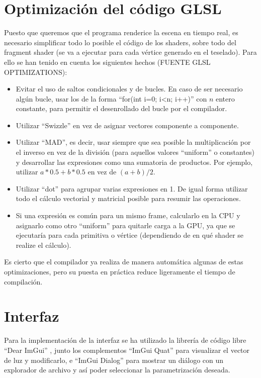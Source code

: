 \newpage
\section*{Optimización del código GLSL}
	Puesto que queremos que el programa renderice la escena en tiempo real, es necesario simplificar todo lo posible el código de los shaders, sobre todo del fragment shader (se va a ejecutar para cada vértice generado en el teselado). Para ello se han tenido en cuenta los siguientes hechos (FUENTE GLSL OPTIMIZATIONS):
	\begin{itemize}
		\item Evitar el uso de saltos condicionales y de bucles. En caso de ser necesario algún bucle, usar los de la forma ``for(int i=$0$; i<n; i++)'' con $n$ entero constante, para permitir el desenrollado del bucle por el compilador.
		\item Utilizar ``Swizzle'' en vez de asignar vectores componente a componente.
		\item Utilizar ``MAD'', es decir, usar siempre que sea posible la multiplicación por el inverso en vez de la división (para aquellos valores ``uniform'' o constantes) y desarrollar las expresiones como una sumatoria de productos. Por ejemplo, utilizar $a*0.5 + b*0.5$ en vez de $(a+b)/2$.
		\item Utilizar ``dot'' para agrupar varias expresiones en 1. De igual forma utilizar todo el cálculo vectorial y matricial posible para resumir las operaciones.
		\item Si una expresión es común para un mismo frame, calcularlo en la CPU y asignarlo como otro ``uniform'' para quitarle carga a la GPU, ya que se ejecutaría para cada primitiva o vértice (dependiendo de en qué shader se realize el cálculo).
	\end{itemize}
	
	Es cierto que el compilador ya realiza de manera automática algunas de estas optimizaciones, pero su puesta en práctica reduce ligeramente el tiempo de compilación.

\section*{Interfaz}
Para la implementación de la interfaz se ha utilizado la librería de código libre ``Dear ImGui'' \cite{DearImGui}, junto los complementos ``ImGui Quat'' \cite{LVector} para visualizar el vector de luz y modificarlo, e ``ImGui Dialog'' \cite{Dialog} para mostrar un diálogo con un explorador de archivo y así poder seleccionar la parametrización deseada.

